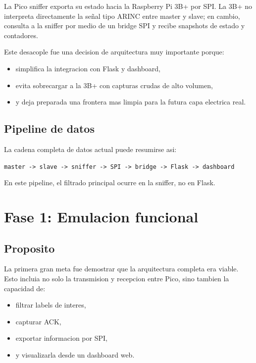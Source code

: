 \documentclass[12pt,a4paper,oneside]{report}
\begin{document}
La Pico sniffer exporta su estado hacia la Raspberry Pi 3B+ por SPI. La 3B+ no interpreta directamente la señal tipo ARINC entre master y slave; en cambio, consulta a la sniffer por medio de un bridge SPI y recibe snapshots de estado y contadores.

Este desacople fue una decision de arquitectura muy importante porque:

\begin{itemize}[leftmargin=1.2cm]
    \item simplifica la integracion con Flask y dashboard,
    \item evita sobrecargar a la 3B+ con capturas crudas de alto volumen,
    \item y deja preparada una frontera mas limpia para la futura capa electrica real.
\end{itemize}

\section{Pipeline de datos}

La cadena completa de datos actual puede resumirse asi:

\begin{center}
\texttt{master -> slave -> sniffer -> SPI -> bridge -> Flask -> dashboard}
\end{center}

En este pipeline, el filtrado principal ocurre en la sniffer, no en Flask.

\chapter{Fase 1: Emulacion funcional}

\section{Proposito}

La primera gran meta fue demostrar que la arquitectura completa era viable. Esto incluia no solo la transmision y recepcion entre Pico, sino tambien la capacidad de:

\begin{itemize}[leftmargin=1.2cm]
    \item filtrar labels de interes,
    \item capturar ACK,
    \item exportar informacion por SPI,
    \item y visualizarla desde un dashboard web.
\end{itemize}
\end{document}
